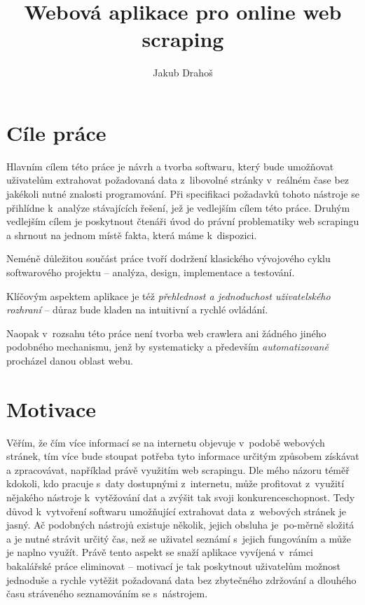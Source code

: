 \documentclass[thesis=B,czech]{FITthesis}[2012/06/26]
\title{Webová aplikace pro online web scraping}
\author{Jakub Drahoš} %
\begin{document}

\begin{introduction}
	\vfill
	\section*{Cíle práce}
	Hlavním cílem této práce je návrh a tvorba softwaru, který bude umožňovat uživatelům extrahovat požadovaná data z~libovolné stránky v~reálném čase bez jakékoli nutné znalosti programování. Při specifikaci požadavků tohoto nástroje se přihlídne k~analýze stávajících řešení, jež je vedlejším cílem této práce. Druhým vedlejším cílem je poskytnout čtenáři úvod do právní problematiky web scrapingu a shrnout na jednom místě fakta, která máme k~dispozici.
	
	Neméně důležitou součást práce tvoří dodržení klasického vývojového cyklu softwarového projektu -- analýza, design, implementace a testování.
	
	Klíčovým aspektem aplikace je též \emph{přehlednost a jednoduchost uživatelského rozhraní} -- důraz bude kladen na intuitivní a rychlé ovládání.
	
	Naopak v~rozsahu této práce není tvorba web crawlera ani žádného jiného podobného mechanismu, jenž by systematicky a především \emph{automatizovaně} procházel danou oblast webu.
	
	\section*{Motivace}
	Věřím, že čím více informací se na internetu objevuje v~podobě webových stránek, tím více bude stoupat potřeba tyto informace určitým způsobem získávat a zpracovávat, například právě využitím web scrapingu. Dle mého názoru téměř kdokoli, kdo pracuje s~daty dostupnými z~internetu, může profitovat z~využití nějakého nástroje k~vytěžování dat a zvýšit tak svoji konkurenceschopnost.
	\newpage
	Tedy důvod k~vytvoření softwaru umožňující extrahovat data z~webových stránek je jasný. Ač podobných nástrojů existuje několik, jejich obsluha je~po-měrně složitá a je nutné strávit určitý čas, než se uživatel seznámí s~jejich fungováním a může je naplno využít. Právě tento aspekt se snaží aplikace vyvíjená v~rámci bakalářské práce eliminovat -- motivací je tak poskytnout uživatelům možnost jednoduše a rychle vytěžit požadovaná data bez zbytečného zdržování a dlouhého času stráveného seznamováním se s~nástrojem.
	

\end{introduction}
\end{document}
